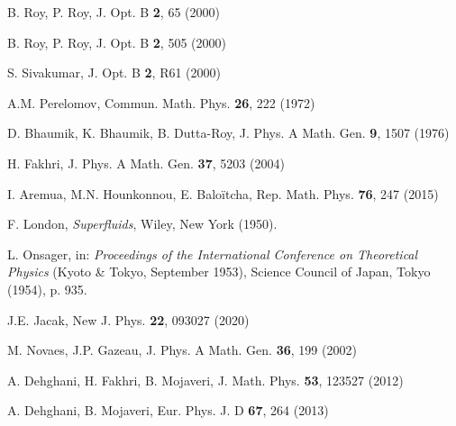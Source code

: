 \documentclass[aps,showpacs,showkeys]{revtex4}
\begin{document}
\begin{thebibliography}{10}
B. Roy, P. Roy, J. Opt. B  {\bf 2}, 65 (2000)

B. Roy, P. Roy, J. Opt. B  {\bf 2}, 505 (2000)

S. Sivakumar, J. Opt. B  {\bf 2}, R61 (2000)

A.M. Perelomov, Commun. Math. Phys.  {\bf 26}, 222 (1972)

D. Bhaumik, K. Bhaumik,  B. Dutta-Roy, J. Phys. A Math. Gen.  {\bf 9},  1507 (1976)

H. Fakhri, J. Phys. A Math. Gen.  {\bf 37},  5203 (2004)

I. Aremua, M.N. Hounkonnou, E. Balo\"{i}tcha, Rep. Math. Phys. {\bf 76}, 247 (2015)


F. London, {\it Superfluids}, Wiley, New York (1950).

L. Onsager, in: {\it Proceedings of the International Conference on Theoretical Physics} (Kyoto \& Tokyo, September 1953), Science Council of Japan, Tokyo (1954), p. 935.

 J.E. Jacak, New J. Phys. {\bf 22}, 093027 (2020)

M. Novaes,  J.P. Gazeau, J. Phys. A Math. Gen.  {\bf 36}, 199 (2002)

A. Dehghani, H. Fakhri, B. Mojaveri, J. Math. Phys. {\bf 53}, 123527 (2012)

A. Dehghani, B. Mojaveri, Eur. Phys. J. D {\bf 67}, 264 (2013)

\end{thebibliography}
\end{document}
